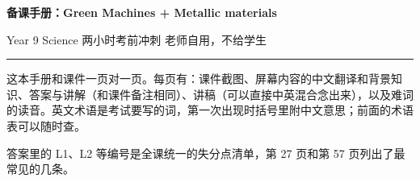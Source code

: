 \documentclass[10pt]{article}
\begin{document}
{\sffamily\bfseries\LARGE 备课手册：Green Machines + Metallic materials\par}\vspace{2pt}
{\sffamily Year 9 Science \textperiodcentered{} 两小时考前冲刺 \textperiodcentered{} 老师自用，不给学生\par}
{\color{rule}\rule{\textwidth}{0.8pt}}\par\medskip
这本手册和课件一页对一页。每页有：课件截图、屏幕内容的中文翻译和背景知识、答案与讲解（和课件备注相同）、讲稿（可以直接中英混合念出来），以及难词的读音。英文术语是考试要写的词，第一次出现时括号里附中文意思；前面的术语表可以随时查。\par
答案里的 L1、L2 等编号是全课统一的失分点清单，第 27 页和第 57 页列出了最常见的几条。\par

\end{document}
